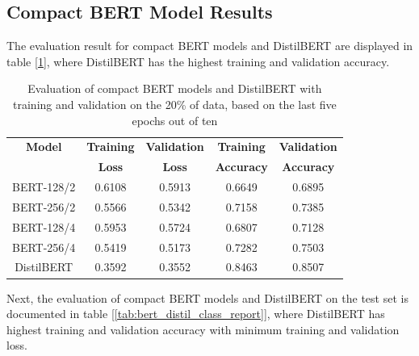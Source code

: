 \documentclass[11pt]{article}
\begin{document}
\subsection{Compact BERT Model Results}
The evaluation result for compact BERT models and DistilBERT are displayed in table [\ref{tab:bert_eval}], where DistilBERT has the highest training and validation accuracy.
 \begin{table}
     \centering
     \begin{tabular}{c c c c c} 
     \hline 
        \textbf{Model}  & \textbf{Training} & \textbf{Validation} & \textbf{Training} & \textbf{Validation} \\
        & \textbf{Loss} & \textbf{Loss} & \textbf{Accuracy}& \textbf{Accuracy}\\
        \hline 
         {\small BERT-128/2} &0.6108 &0.5913 &0.6649 &0.6895\\ 
          {\small BERT-256/2} & 0.5566&0.5342 &0.7158 &0.7385 \\  
          {\small BERT-128/4} &0.5953 &0.5724 & 0.6807&0.7128\\  
         {\small BERT-256/4} &0.5419& 0.5173&0.7282 & 0.7503 \\ 
         {\small DistilBERT} & 0.3592 &0.3552& 0.8463  & 0.8507\\\hline 
     \end{tabular}
     \caption{Evaluation of compact BERT models and DistilBERT with training and validation on the 20\% of data, based on the last five epochs out of ten}
     \label{tab:bert_eval}
 \end{table}
 Next, the evaluation of compact BERT models and DistilBERT on the test set is documented in table [\ref{tab:bert_distil_class_report}], where DistilBERT has highest training and validation accuracy with minimum training and validation loss.
\end{document}
